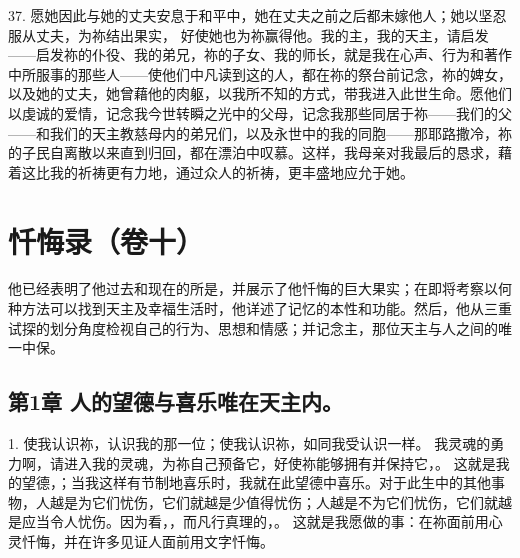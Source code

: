 37. 愿她因此与她的丈夫安息于和平中，她在丈夫之前之后都未嫁他人；她以坚忍服从丈夫，为祢结出果实， 好使她也为祢赢得他。我的主，我的天主，请启发——启发祢的仆役、我的弟兄，祢的子女、我的师长，就是我在心声、行为和著作中所服事的那些人——使他们中凡读到这的人，都在祢的祭台前记念，祢的婢女，以及她的丈夫，她曾藉他的肉躯，以我所不知的方式，带我进入此世生命。愿他们以虔诚的爱情，记念我今世转瞬之光中的父母，记念我那些同居于祢——我们的父——和我们的天主教慈母内的弟兄们，以及永世中的我的同胞——那耶路撒冷，祢的子民自离散以来直到归回，都在漂泊中叹慕。这样，我母亲对我最后的恳求，藉着这比我的祈祷更有力地，通过众人的祈祷，更丰盛地应允于她。\par



\section{忏悔录（卷十）}

他已经表明了他过去和现在的所是，并展示了他忏悔的巨大果实；在即将考察以何种方法可以找到天主及幸福生活时，他详述了记忆的本性和功能。然后，他从三重试探的划分角度检视自己的行为、思想和情感；并记念主，那位天主与人之间的唯一中保。\par


\subsection{第1章 人的望德与喜乐唯在天主内。}

1. 使我认识祢，认识我的那一位；使我认识祢，如同我受认识一样。 我灵魂的勇力啊，请进入我的灵魂，为祢自己预备它，好使祢能够拥有并保持它，。 这就是我的望德，；当我这样有节制地喜乐时，我就在此望德中喜乐。对于此生中的其他事物，人越是为它们忧伤，它们就越是少值得忧伤；人越是不为它们忧伤，它们就越是应当令人忧伤。因为看，，而凡行真理的，。 这就是我愿做的事：在祢面前用心灵忏悔，并在许多见证人面前用文字忏悔。\par

